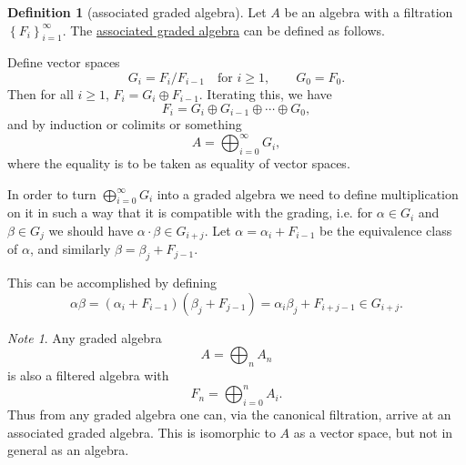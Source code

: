 \documentclass[a4paper]{report}
\newcommand{\defn}[1]{\ul{#1}}
\theoremstyle{definition}
\newtheorem{definition}{Definition}[section]
\theoremstyle{plain}
\theoremstyle{remark}
\newtheorem{note}{Note}[section]
\begin{document}
\begin{definition}[associated graded algebra]
  Let $A$ be an algebra with a filtration $\left\{ F_{i} \right\}_{i = 1}^{\infty}$. The \defn{associated graded algebra} can be defined as follows. 

  Define vector spaces
  \begin{equation*}
    G_{i} = F_{i}/F_{i-1}\quad \text{for }i \geq 1,\qquad G_{0} = F_{0}.
  \end{equation*}
  Then for all $i \geq 1$, $F_{i} = G_{i}\oplus F_{i-1}$. Iterating this, we have
  \begin{equation*}
    F_{i} = G_{i} \oplus G_{i-1} \oplus \cdots \oplus G_{0},
  \end{equation*}
  and by induction or colimits or something
  \begin{equation*}
    A = \bigoplus_{i=0}^{\infty} G_{i},
  \end{equation*}
  where the equality is to be taken as equality of vector spaces.

  In order to turn $\bigoplus_{i=0}^{\infty} G_{i}$ into a graded algebra we need to define multiplication on it in such a way that it is compatible with the grading, i.e. for $\alpha \in G_{i}$ and $\beta \in G_{j}$ we should have $\alpha\cdot\beta \in G_{i+j}$. Let $\alpha = \alpha_{i} + F_{i-1}$ be the equivalence class of $\alpha$, and similarly $\beta = \beta_{j} + F_{j-1}$.

  This can be accomplished by defining
  \begin{equation*}
    \alpha\beta = (\alpha_{i} + F_{i-1})(\beta_{j} + F_{j-1}) = \alpha_{i}\beta_{j} + F_{i+j-1} \in G_{i+j}.
  \end{equation*}
\end{definition}

\begin{note}
  Any graded algebra
  \begin{equation*}
    A = \bigoplus_{n} A_{n}
  \end{equation*}
  is also a filtered algebra with
  \begin{equation*}
    F_{n} = \bigoplus_{i=0}^{n} A_{i}.
  \end{equation*}
  Thus from any graded algebra one can, via the canonical filtration, arrive at an associated graded algebra. This is isomorphic to $A$ as a vector space, but not in general as an algebra.
\end{note}
\end{document}
